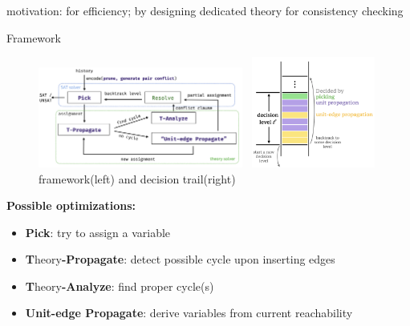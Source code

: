 
\begin{frame}
	motivation: for efficiency; by designing dedicated theory for consistency checking
\end{frame}

\begin{frame}{Framework}

	\begin{figure}[H]
		\centering
		\includegraphics[width=0.6\textwidth]{figs/acyclic-minisat-framework.png}~
		\includegraphics[width=0.36\textwidth]{figs/acyclic-minisat-decision-trail.png}
		\vspace*{0.30cm}
		\footnotesize{framework(left) and decision trail(right)}
	\end{figure}

	\footnotesize{\textcolor[RGB]{71,46,125}{\textbf{Possible optimizations:}}}
	\scriptsize{
		\begin{itemize}
			\item \textcolor[RGB]{71,46,125}{\textbf{Pick}}: try to assign a variable
			\item \textcolor[RGB]{71,46,125}{\textbf{T}}heory\textcolor[RGB]{71,46,125}{\textbf{-Propagate}}: detect possible cycle upon inserting edges
			\item \textcolor[RGB]{71,46,125}{\textbf{T}}heory\textcolor[RGB]{71,46,125}{\textbf{-Analyze}}: find proper cycle(s)
			\item \textcolor[RGB]{71,46,125}{\textbf{Unit-edge Propagate}}: derive variables from current reachability
		\end{itemize}
	}
\end{frame}

